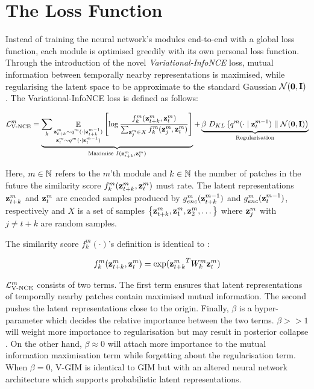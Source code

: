 	
		
\section{The Loss Function} \label{cha:vgim_learning_objective}
	Instead of training the neural network's modules end-to-end with a global loss function, each module is optimised greedily with its own personal loss function. Through the introduction of the novel \textit{Variational-InfoNCE} loss, mutual information between temporally nearby representations is maximised, while regularising the latent space to be approximate to the standard Gaussian $\mathcal{N}(\bm{\mathbf{0}}, \mathbf{I})$. The Variational-InfoNCE loss is defined as follows:
	
	\begin{equation} %
		\Lvnce^m =
		\underbrace{\reconstrgim}_{\text{Maximise } I(\ztk^m, \zt^m)} + \underbrace{\beta ~ \latentspaceconstraintgim}_{\text{Regularisation}}
		\label{eq:variational_gim_loss}
	\end{equation}

	Here, $m \in \mathbb{N}$ refers to the $m$'th module and $k \in \mathbb{N}$ the number of patches in the future the similarity score $f_k^m({\mathbf{z}_{t+k}^m},{\mathbf{z}_t^m})$ must rate. The latent representations $\mathbf{z}_{t+k}^m$ and $\mathbf{z}_t^m$ are encoded samples produced by $g_{enc}^m(\mathbf{z}_{t+k}^{m-1})$ and $g_{enc}^m(\mathbf{z}_t^{m-1})$, respectively and $X$ is a set of samples ${ \left\{ \mathbf{z}_{t+k}^m, \mathbf{z}_1^m, \mathbf{z}_2^m, \dots \right\} }$ where $\mathbf{z}_j^m$ with $j \neq t \! + \! k$ are random samples.


	The similarity score $f_k^m(\cdot)$'s definition is identical to \citep{lowePuttingEndEndtoEnd2020a}:
	
	$$ f_k^m(\mathbf{z}_{t+k}^m,\mathbf{z}_t^m) = \exp({\mathbf{z}_{t+k}^m}^TW_k^m\mathbf{z}_t^m) $$
	
	
	$\mathcal{L}_{\text{V-NCE}}^m$ consists of two terms. The first term ensures that latent representations of temporally nearby patches contain maximised mutual information. The second pushes the latent representations close to the origin. Finally, $\beta$ is a hyper-parameter which decides the relative importance between the two terms. $\beta >> 1$ will weight more importance to regularisation but may result in posterior collapse \citep{lucasUnderstandingPosteriorCollapse2022}. On the other hand, $\beta \approx 0$ will attach more importance to the mutual information maximisation term while forgetting about the regularisation term. When $\beta = 0$, V-GIM is identical to GIM but with an altered neural network architecture which supports probabilistic latent representations.
	
